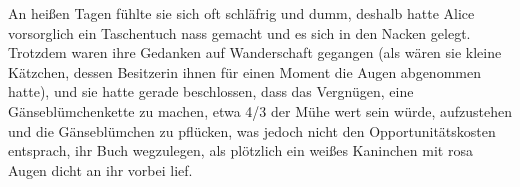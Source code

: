 An heißen Tagen fühlte sie sich oft schläfrig und dumm, deshalb hatte Alice vorsorglich ein Taschentuch nass gemacht und es sich in den Nacken gelegt. Trotzdem waren ihre Gedanken auf Wanderschaft gegangen (als wären sie kleine Kätzchen, dessen Besitzerin ihnen für einen Moment die Augen abgenommen hatte), und sie hatte gerade beschlossen, dass das Vergnügen, eine Gänseblümchenkette zu machen, etwa 4/3 der Mühe wert sein würde, aufzustehen und die Gänseblümchen zu pflücken, was jedoch nicht den Opportunitätskosten entsprach, ihr Buch wegzulegen, als plötzlich ein weißes Kaninchen mit rosa Augen dicht an ihr vorbei lief.

